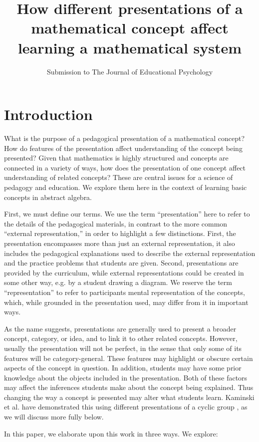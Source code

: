 \documentclass[man,10pt]{apa6}
\title{How different presentations of a mathematical concept affect learning a mathematical system}
\author{Submission to The Journal of Educational Psychology}
\affiliation{Submission: November 15th, 2016\\ Revision: April 27th, 2017} %
\date{}
\begin{document}
\maketitle
\section{Introduction}
What is the purpose of a pedagogical presentation of a mathematical concept? How do features of the presentation affect understanding of the concept being presented? Given that mathematics is highly structured and concepts are connected in a variety of ways, how does the presentation of one concept affect understanding of related concepts? These are central issues for a science of pedagogy and education. We explore them here in the context of learning basic concepts in abstract algebra.  \par
First, we must define our terms. We use the term ``presentation'' here to refer to the details of the pedagogical materials, in contrast to the more common ``external representation,'' in order to highlight a few distinctions. First, the presentation encompasses more than just an external representation, it also includes the pedagogical explanations used to describe the external representation and the practice problems that students are given. Second, presentations are provided by the curriculum, while external representations could be created in some other way, e.g. by a student drawing a diagram. We reserve the term ``representation'' to refer to participants mental representation of the concepts, which, while grounded in the presentation used, may differ from it in important ways. \par
As the name suggests, presentations are generally used to present a broader concept, category, or idea, and to link it to other related concepts. However, usually the presentation will not be perfect, in the sense that only some of its features will be category-general. These features may highlight or obscure certain aspects of the concept in question. In addition, students may have some prior knowledge about the objects included in the presentation. Both of these factors may affect the inferences students make about the concept being explained. Thus changing the way a concept is presented may alter what students learn. Kaminski et al. have demonstrated this using different presentations of a cyclic group \cite{Kaminski2008}, as we will discuss more fully below. \par
In this paper, we elaborate upon this work in three ways. We explore:
\end{document}
